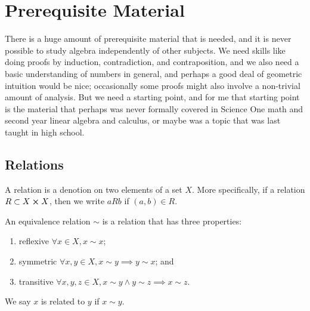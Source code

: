 \section{Prerequisite Material}

\begin{remark}
    There is a huge amount of prerequisite material that is needed,
    and it is never possible to study algebra independently of other subjects.
    We need skills like doing proofs
    by induction, contradiction, and contraposition,
    and we also need a basic understanding of numbers in general,
    and perhaps a good deal of geometric intuition would be nice;
    occasionally some proofs might also involve a non-trivial amount of analysis.
    But we need a starting point,
    and for me that starting point
    is the material that perhaps was never formally covered in Science One math
    and second year linear algebra and calculus,
    or maybe was a topic that was last taught in high school.
\end{remark}


\subsection{Relations}

\begin{definition}
    A relation is a denotion on two elements of a set \(X\).
    More specifically,
    if a relation \(R \subset X \cross X\),
    then we write \(aRb\) if \((a,b) \in R\).
\end{definition}

\begin{definition}
    An equivalence relation \(\sim\)
    is a relation that has three properties:
    \begin{enumerate}[label={(\roman*)}, itemsep=0mm]
        \item reflexive \(\forall x \in X, x \sim x\);
        \item symmetric \(\forall x,y \in X, x \sim y \implies y \sim x\); and
        \item transitive \(\forall x,y,z \in X,
            x \sim y \land y \sim z \implies x \sim z\).
    \end{enumerate}
    We say \(x\) is related to \(y\) if \(x \sim y\).
\end{definition}

